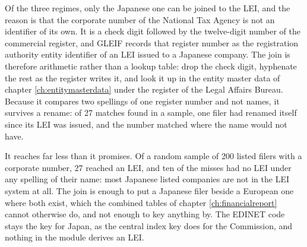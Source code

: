 Of the three regimes, only the Japanese one can be joined to the LEI, and the reason is that the corporate number of the National Tax Agency is not an identifier of its own. It is a check digit followed by the twelve-digit number of the commercial register, and GLEIF records that register number as the registration authority entity identifier of an LEI issued to a Japanese company. The join is therefore arithmetic rather than a lookup table: drop the check digit, hyphenate the rest as the register writes it, and look it up in the entity master data of chapter \ref{ch:entitymasterdata} under the register of the Legal Affairs Bureau. Because it compares two spellings of one register number and not names, it survives a rename: of 27 matches found in a sample, one filer had renamed itself since its LEI was issued, and the number matched where the name would not have.

It reaches far less than it promises. Of a random sample of 200 listed filers with a corporate number, 27 reached an LEI, and ten of the misses had no LEI under any spelling of their name: most Japanese listed companies are not in the LEI system at all. The join is enough to put a Japanese filer beside a European one where both exist, which the combined tables of chapter \ref{ch:financialreport} cannot otherwise do, and not enough to key anything by. The EDINET code stays the key for Japan, as the central index key does for the Commission, and nothing in the module derives an LEI.
